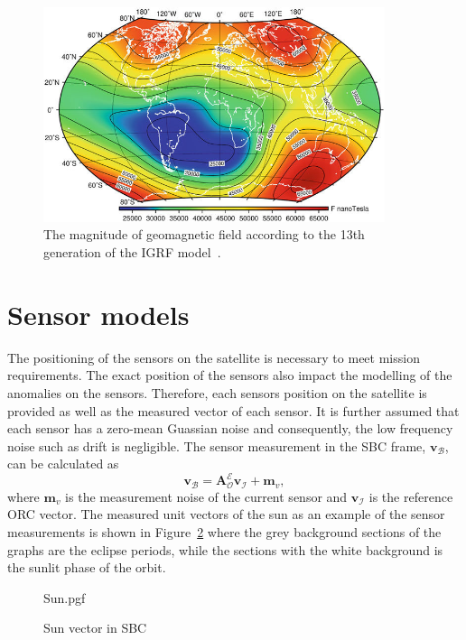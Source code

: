 \begin{figure}[!htb]
	\centering
	\includegraphics[width = 10cm]{Figures/IGRF-13th.png}
	\caption{The magnitude of geomagnetic field according to the 13th generation of the IGRF model~\cite{koskinen2022radiation}.}
	\label{fig:IGRF13th}
\end{figure}

\section{Sensor models}
The positioning of the sensors on the satellite is necessary to meet mission requirements. The exact position of the sensors also impact the modelling of the anomalies on the sensors. Therefore, each sensors position on the satellite is provided as well as the measured vector of each sensor. It is further assumed that each sensor has a zero-mean Guassian noise and consequently, the low frequency noise such as drift is negligible. The sensor measurement in the SBC frame, $\mathbf{v}_{\mathcal{B}}$,  can be calculated as
\begin{equation}
\mathbf{v}_{\mathcal{B}} = \boldsymbol{A}_{\mathcal{O}}^{\mathcal{E}} \mathbf{v}_{\mathcal{I}} + \mathbf{m}_v,
\end{equation}
where $\mathbf{m}_v$ is the measurement noise of the current sensor and $\mathbf{v}_{\mathcal{I}}$ is the reference ORC vector. The measured unit vectors of the sun as an example of the sensor measurements is shown in Figure~\ref{fig:SunSensorPlot} where the grey background sections of the graphs are the eclipse periods, while the sections with the white background is the sunlit phase of the orbit.

\begin{figure}[!htb]
	\centering
	\def\pgfwidth{7cm}
	{Sun.pgf}
	
	\caption{Sun vector in SBC}
	\label{fig:SunSensorPlot}
\end{figure}

